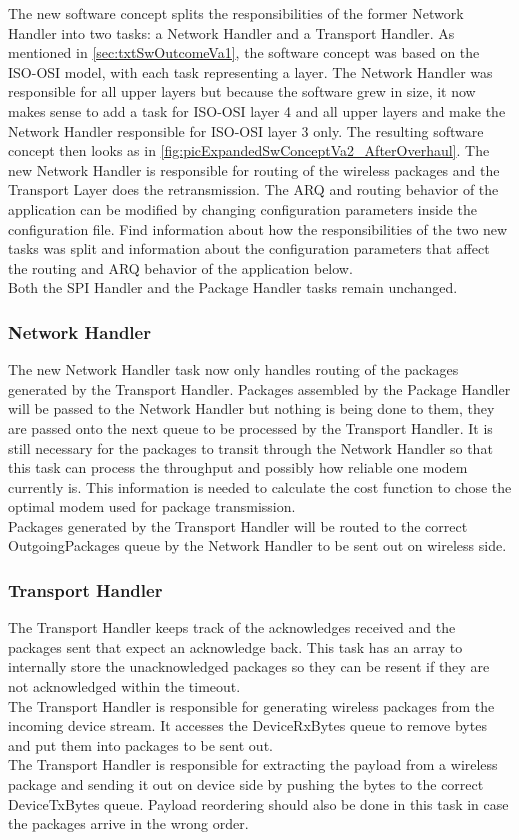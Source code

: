 The new software concept splits the responsibilities of the former Network Handler into two tasks: a Network Handler and a Transport Handler. As mentioned in \autoref{sec:txtSwOutcomeVa1}, the software concept was based on the ISO-OSI model, with each task representing a layer. The Network Handler was responsible for all upper layers but because the software grew in size, it now makes sense to add a task for ISO-OSI layer 4 and all upper layers and make the Network Handler responsible for ISO-OSI layer 3 only. The resulting software concept then looks as in \autoref{fig:picExpandedSwConceptVa2_AfterOverhaul}. The new Network Handler is responsible for routing of the wireless packages and the Transport Layer does the retransmission. The ARQ and routing behavior of the application can be modified by changing configuration parameters inside the configuration file. Find information about how the responsibilities of the two new tasks was split and information about the configuration parameters that affect the routing and ARQ behavior of the application below.\\
Both the SPI Handler and the Package Handler tasks remain unchanged.\\
%
\subsubsection{Network Handler}
The new Network Handler task now only handles routing of the packages generated by the Transport Handler. Packages assembled by the Package Handler will be passed to the Network Handler but nothing is being done to them, they are passed onto the next queue to be processed by the Transport Handler. It is still necessary for the packages to transit through the Network Handler so that this task can process the throughput and possibly how reliable one modem currently is. This information is needed to calculate the cost function to chose the optimal modem used for package transmission.\\
Packages generated by the Transport Handler will be routed to the correct OutgoingPackages queue by the Network Handler to be sent out on wireless side.
%
\subsubsection{Transport Handler}
The Transport Handler keeps track of the acknowledges received and the packages sent that expect an acknowledge back. This task has an array to internally store the unacknowledged packages so they can be resent if they are not acknowledged within the timeout.\\
The Transport Handler is responsible for generating wireless packages from the incoming device stream. It accesses the DeviceRxBytes queue to remove bytes and put them into packages to be sent out.\\
The Transport Handler is responsible for extracting the payload from a wireless package and sending it out on device side by pushing the bytes to the correct DeviceTxBytes queue. Payload reordering should also be done in this task in case the packages arrive in the wrong order.
%
